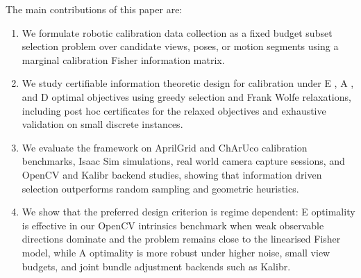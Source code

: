 \documentclass[letterpaper, 9
 pt, conference]{ieeeconf}
\begin{document}
The main contributions of this paper are:
\begin{enumerate}[leftmargin=1.5em]
    \item We formulate robotic calibration data collection as a fixed budget
    subset selection problem over candidate views, poses, or motion segments
    using a marginal calibration Fisher information matrix.

    \item We study certifiable information theoretic design for calibration
    under E , A , and D optimal objectives using greedy selection and
    Frank Wolfe relaxations, including post hoc certificates for the relaxed
    objectives and exhaustive validation on small discrete instances.

    \item We evaluate the framework on AprilGrid and ChArUco calibration
    benchmarks, Isaac Sim simulations, real world camera capture
    sessions, and OpenCV and Kalibr backend studies, showing that
    information driven selection outperforms random sampling and geometric
    heuristics.

    \item We show that the preferred design criterion is regime dependent:
    E optimality is effective in our OpenCV intrinsics benchmark when weak
    observable directions dominate and the problem remains close to the
    linearised Fisher model, while A optimality is more robust under
    higher noise, small view budgets, and joint bundle adjustment backends such
    as Kalibr.
\end{enumerate}



\end{document}
